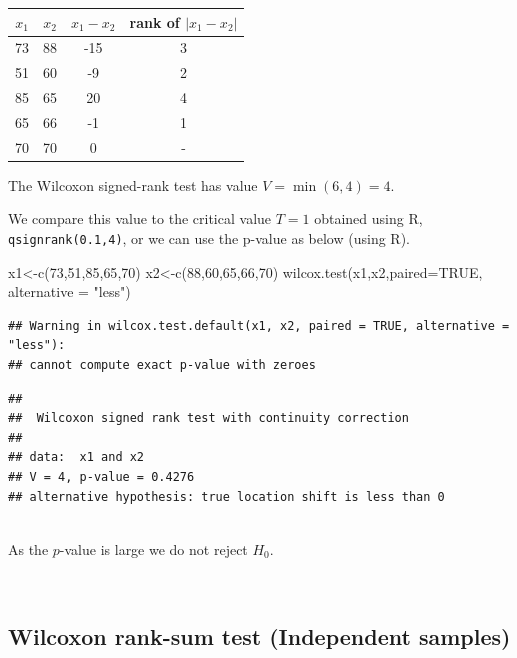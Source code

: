 \documentclass[
]{article}
\newcommand{\AttributeTok}[1]{\textcolor[rgb]{0.77,0.63,0.00}{#1}}
\newcommand{\ConstantTok}[1]{\textcolor[rgb]{0.00,0.00,0.00}{#1}}
\newcommand{\DecValTok}[1]{\textcolor[rgb]{0.00,0.00,0.81}{#1}}
\newcommand{\FunctionTok}[1]{\textcolor[rgb]{0.00,0.00,0.00}{#1}}
\newcommand{\NormalTok}[1]{#1}
\newcommand{\OtherTok}[1]{\textcolor[rgb]{0.56,0.35,0.01}{#1}}
\newcommand{\StringTok}[1]{\textcolor[rgb]{0.31,0.60,0.02}{#1}}
\begin{document}
\begin{longtable}[]{@{}cccc@{}}
\toprule()
\(x_1\) & \(x_2\) & \(x_1-x_2\) & rank of \(|x_1-x_2|\) \\
\midrule()
\endhead
73 & 88 & -15 & 3 \\
51 & 60 & -9 & 2 \\
85 & 65 & 20 & 4 \\
65 & 66 & -1 & 1 \\
70 & 70 & 0 & - \\
\bottomrule()
\end{longtable}

The Wilcoxon signed-rank test has value \(V=\min(6,4)=4\).

We compare this value to the critical value \(T=1\) obtained using R,
\texttt{qsignrank(0.1,4)}, or we can use the p-value as below (using R).

\begin{Highlighting}[]
\NormalTok{x1}\OtherTok{\textless{}{-}}\FunctionTok{c}\NormalTok{(}\DecValTok{73}\NormalTok{,}\DecValTok{51}\NormalTok{,}\DecValTok{85}\NormalTok{,}\DecValTok{65}\NormalTok{,}\DecValTok{70}\NormalTok{)}
\NormalTok{x2}\OtherTok{\textless{}{-}}\FunctionTok{c}\NormalTok{(}\DecValTok{88}\NormalTok{,}\DecValTok{60}\NormalTok{,}\DecValTok{65}\NormalTok{,}\DecValTok{66}\NormalTok{,}\DecValTok{70}\NormalTok{)  }
\FunctionTok{wilcox.test}\NormalTok{(x1,x2,}\AttributeTok{paired=}\ConstantTok{TRUE}\NormalTok{, }\AttributeTok{alternative =} \StringTok{"less"}\NormalTok{) }
\end{Highlighting}

\begin{verbatim}
## Warning in wilcox.test.default(x1, x2, paired = TRUE, alternative = "less"):
## cannot compute exact p-value with zeroes
\end{verbatim}

\begin{verbatim}
## 
##  Wilcoxon signed rank test with continuity correction
## 
## data:  x1 and x2
## V = 4, p-value = 0.4276
## alternative hypothesis: true location shift is less than 0
\end{verbatim}

\(~\)\\
As the \(p\)-value is large we do not reject \(H_0\).

\(~\)

\hypertarget{wilcoxon-rank-sum-test-independent-samples}{%
\subsection{Wilcoxon rank-sum test (Independent
samples)}\label{wilcoxon-rank-sum-test-independent-samples}}
\end{document}
